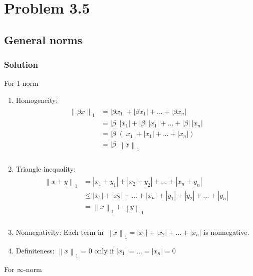 \documentclass{article}
\newcommand{\norm}[1]{\left\lVert#1\right\rVert}
\begin{document}
\section*{Problem 3.5}
\subsection*{General norms}
\subsubsection*{Solution}
For 1-norm
\begin{enumerate}[label=(\alph*)]
  \item Homogeneity:
  \begin{align*}
  \begin{split}
      \norm{\beta x}_1 & = |\beta x_1| + |\beta x_1| + \ldots + |\beta x_n|\\
      & = |\beta|\ |x_1| + |\beta|\ |x_1| + \ldots + |\beta|\ |x_n|\\
      & = |\beta| (|x_1| + |x_1| + \ldots + |x_n|)\\
      & = |\beta| \norm{x}_1\\
  \end{split}
  \end{align*}
  \item Triangle inequality:
  \begin{align*}
  \begin{split}
      \norm{x + y}_1 & = |x_1+y_1| + |x_2+y_2| + \ldots + |x_n+y_n|\\
      & \leq |x_1| + |x_2| + \ldots + |x_n| + |y_1| + |y_2| + \ldots + |y_n|\\
      & = \norm{x}_1 + \norm{y}_1\\
  \end{split}
  \end{align*}
  \item Nonnegativity: Each term in $ \norm{x}_1 = |x_1| + |x_2| + \ldots + |x_n| $ is nonnegative.
  \item Definiteness: $\norm{x}_1$ = 0 only if $|x_1| = \ldots =  |x_n| = 0$
\end{enumerate}
For $\infty$-norm
\end{document}
